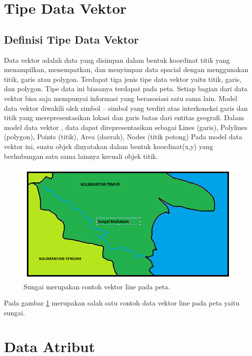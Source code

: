 \section{Tipe Data Vektor}
\subsection{Definisi Tipe Data Vektor}
Data vektor adalah data yang disimpan dalam bentuk koordinat titik yang menampilkan, 
menempatkan, dan menyimpan data spacial dengan menggunakan titik, garis atau polygon.
Terdapat tiga jenis tipe data vektor yaitu titik, garis, dan polygon. Tipe data ini 
biasanya terdapat pada peta. Setiap bagian dari data vektor bisa saja mempunyai 
informasi yang berasosiasi satu sama lain.
Model data vektor diwakili oleh simbol – simbol yang terdiri atas interkoneksi garis
dan titik yang merepresentasikan lokasi dan garis batas dari entitas geografi. Dalam
model data vektor , data dapat direpresentasikan sebagai Lines (garis), Polylines 
(polygon), Points (titik), Area (daerah), Nodes (titik potong) Pada model data vektor ini, 
suatu objek dinyatakan dalam bentuk koordinat(x,y) yang berhubungan satu sama lainnya kecuali objek titik.
\begin{figure}[ht]
	\centerline{\includegraphics[width=1\textwidth]{figures/sungai.PNG}}
	\caption{Sungai merupakan contoh vektor line pada peta.}
	\label{sungai}
	\end{figure}
   
Pada gambar \ref{sungai} merupakan salah satu contoh data vektor line pada peta yaitu sungai.
\section{Data Atribut}
